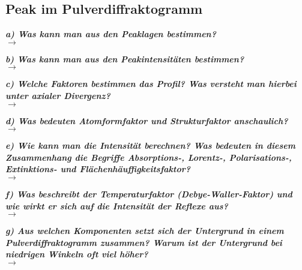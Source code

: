 \subsection{\label{subsec:FZV7}Peak im Pulverdiffraktogramm}
\textbf{\textit{a) Was kann man aus den Peaklagen bestimmen?}}\\
$\rightarrow$

\textbf{\textit{b) Was kann man aus den Peakintensitäten bestimmen?}}\\
$\rightarrow$

\textbf{\textit{c) Welche Faktoren bestimmen das Profil? Was versteht man hierbei unter
axialer Divergenz?}}\\
$\rightarrow$

\textbf{\textit{d) Was bedeuten Atomformfaktor und Strukturfaktor anschaulich?}}\\
$\rightarrow$

\textbf{\textit{e) Wie kann man die Intensität berechnen? 
Was bedeuten in diesem Zusammenhang die Begriffe Absorptions-, Lorentz-, 
Polarisations-, Extinktions- und Flächenhäuffigkeitsfaktor?}}\\
$\rightarrow$

\textbf{\textit{f) Was beschreibt der Temperaturfaktor (Debye-Waller-Faktor) und wie
wirkt er sich auf die Intensität der Reflexe aus?}}\\
$\rightarrow$

\textbf{\textit{g) Aus welchen Komponenten setzt sich der Untergrund in einem 
Pulverdiffraktogramm zusammen? Warum ist der Untergrund bei niedrigen Winkeln
oft viel höher?}}\\
$\rightarrow$